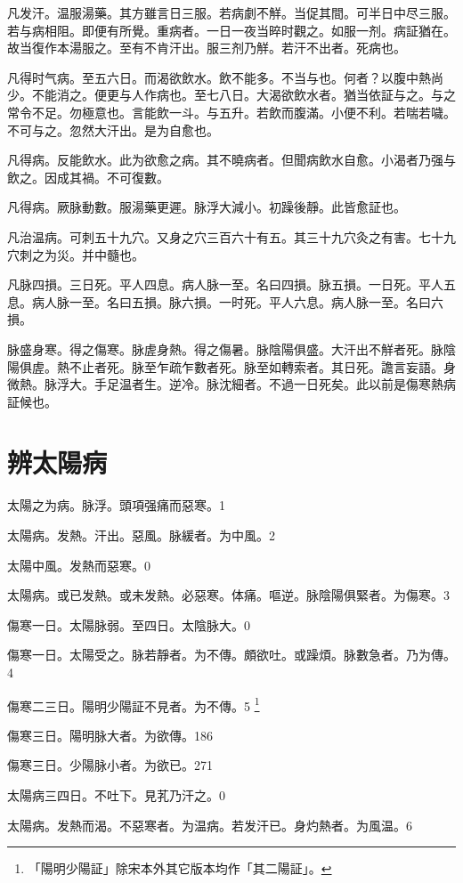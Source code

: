 \documentclass[12pt,twoside,UTF8,b5paper]{ctexbook}
\begin{document}
凡发汗。温服湯藥。其方雖言日三服。若病劇不觧。当促其間。可半日中尽三服。若与病相阻。即便有所覺。重病者。一日一夜当晬时觀之。如服一剂。病証猶在。故当復作本湯服之。至有不肯汗出。服三剂乃觧。若汗不出者。死病也。

凡得时气病。至五六日。而渴欲飲水。飲不能多。不当与也。何者？以腹中熱尚少。不能消之。便更与人作病也。至七八日。大渴欲飲水者。猶当依証与之。与之常令不足。勿極意也。言能飲一斗。与五升。若飲而腹滿。小便不利。若喘若噦。不可与之。忽然大汗出。是为自愈也。

凡得病。反能飲水。此为欲愈之病。其不曉病者。但聞病飲水自愈。小渴者乃强与飲之。因成其禍。不可復數。

凡得病。厥脉動數。服湯藥更遲。脉浮大減小。初躁後靜。此皆愈証也。

凡治温病。可刺五十九穴。又身之穴三百六十有五。其三十九穴灸之有害。七十九穴刺之为災。并中髓也。

凡脉四損。三日死。平人四息。病人脉一至。名曰四損。脉五損。一日死。平人五息。病人脉一至。名曰五損。脉六損。一时死。平人六息。病人脉一至。名曰六損。

脉盛身寒。得之傷寒。脉虗身熱。得之傷暑。脉陰陽俱盛。大汗出不觧者死。脉陰陽俱虗。熱不止者死。脉至乍疏乍數者死。脉至如轉索者。其日死。譫言妄語。身微熱。脉浮大。手足温者生。逆冷。脉沈細者。不過一日死矣。此以前是傷寒熱病証候也。

\chapter{辨太陽病}

太陽之为病。{脉浮。}頭項强痛而惡寒。1

太陽病。发熱。汗出。惡風。脉緩者。为中風。2

太陽中風。发熱而惡寒。0

太陽病。或已发熱。或未发熱。必惡寒。体痛。嘔逆。脉陰陽俱緊者。为傷寒。3

傷寒一日。太陽脉弱。至四日。太陰脉大。0

傷寒一日。太陽受之。脉若靜者。为不傳。頗欲吐。或躁煩。脉數急者。乃为傳。4

傷寒{二三日}。陽明少陽証不見者。为不傳。5
	\footnote{「陽明少陽証」除宋本外其它版本均作「其二陽証」。}

傷寒三日。陽明脉大{者。为欲傳}。186

傷寒三日。少陽脉小者。为欲已。271

太陽病三四日。不吐下。見芤乃汗之。0

太陽病。发熱而渴。不惡寒者。为温病。若发汗已。身灼熱者。为風温。6
\end{document}
